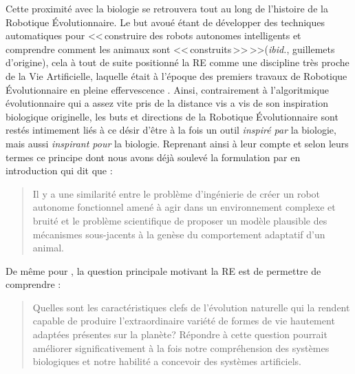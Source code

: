 Cette proximité avec la biologie se retrouvera tout au long de l'histoire de la Robotique \'Evolutionnaire. Le but avoué étant de développer des techniques automatiques pour <<\,construire des robots autonomes intelligents et comprendre comment les animaux sont <<\,construits\,>>\,>>(\emph{ibid.}, guillemets d'origine),  cela à tout de suite positionné la RE comme une discipline très proche de la Vie Artificielle, laquelle était à l'époque des premiers travaux de Robotique \'Evolutionnaire en pleine effervescence \citep{langton89alifeiproceedingsfirstinternationalworkshopsynthesissimulationlivingsystems}. Ainsi, contrairement à l'algoritmique évolutionnaire qui a assez vite pris de la distance vis a vis de son inspiration biologique originelle, les buts et directions de la Robotique \'Evolutionnaire sont restés intimement liés à ce désir d'être à la fois un outil \emph{inspiré par} la biologie, mais aussi \emph{inspirant pour} la biologie. Reprenant ainsi à leur compte et selon leurs termes ce principe dont nous avons déjà soulevé la formulation par \cite{maynardsmith78optimizationtheoryinevolution} en introduction qui dit que :

\begin{quotation}

   Il y a une similarité entre le problème d'ingénierie de créer un robot autonome fonctionnel amené à agir dans un environnement complexe et bruité et le problème scientifique de proposer un modèle plausible des mécanismes sous-jacents à la genèse du comportement adaptatif d'un animal.\\

   \citep[p. 74]{cliff93explorationsinevolutionaryrobotics}

\end{quotation}

De même pour \citet[p. 12-13]{nolfi00evolrobobiolintetechselfmach}, la question principale motivant la RE est de permettre de comprendre :

\begin{quotation}

   Quelles sont les caractéristiques clefs de l'évolution naturelle qui la rendent capable de produire l'extraordinaire variété de formes de vie hautement adaptées présentes sur la planète? Répondre à cette question pourrait améliorer significativement à la fois notre compréhension des systèmes biologiques et notre habilité a concevoir des systèmes artificiels.

\end{quotation}

